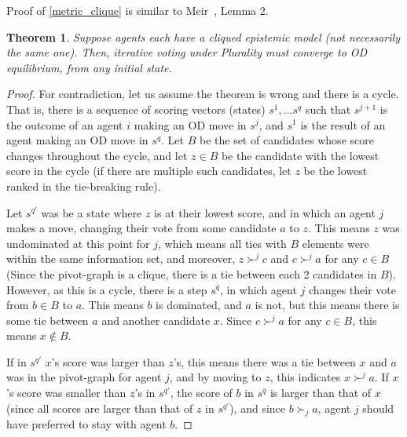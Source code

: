 \documentclass[letterpaper]{article} %
\newtheorem{theorem}{Theorem}
\begin{document}
Proof of \ref{metric_clique} is similar to Meir~, Lemma 2.

\begin{theorem}
Suppose agents each have a cliqued epistemic model (not necessarily the same one). Then, iterative voting under Plurality must converge to OD equilibrium, from any initial state.
\end{theorem}
\begin{proof}
For contradiction, let us assume the theorem is wrong and there is a cycle. That is, there is a sequence of scoring vectors (states) ${s}^{1},\ldots {s}^{q}$ such that ${s}^{j+1}$ is the outcome of an agent $i$ making an OD move in ${s}^{j}$, and ${s}^{1}$ is the result of an agent making an OD move in ${s}^{q}$. Let $B$ be the set of candidates whose score changes throughout the cycle, and let $z\in B$ be the candidate with the lowest score in the cycle (if there are multiple such candidates, let $z$ be the lowest ranked in the tie-breaking rule).

Let ${s}^{q'}$ was be a state where $z$ is at their lowest score, and in which an agent $j$ makes a move, changing their vote from some candidate $a$ to $z$. This means $z$ was undominated at this point for $j$, which means all ties with $B$ elements were within the same information set, and moreover, $z\succ^{j}c$ and $c\succ^{j}a$ for any $c\in B$ (Since the pivot-graph is a clique, there is a tie between each 2 candidates in $B$). However, as this is a cycle, there is a step ${s}^{\bar{q}}$, in which agent $j$ changes their vote from $b\in B$ to $a$. This means $b$ is dominated, and $a$ is not, but this means there is some tie between $a$ and another candidate $x$. Since $c\succ^{j} a$ for any $c\in B$, this means $x\notin B$.

If in ${s}^{q'}$ $x$'s score was larger than $z$'s, this means there was a tie between $x$ and $a$ was in the pivot-graph for agent $j$, and by moving to $z$, this indicates $x\succ^{j} a$. If $x$'s score was smaller than $z$'s in ${s}^{q'}$, the score of $b$ in ${s}^{\bar{q}}$ is larger than that of $x$ (since all scores are larger than that of $z$ in ${s}^{q'}$), and since $b\succ_{j}a$, agent $j$ should have preferred to stay with agent $b$.
\end{proof}
\end{document}
